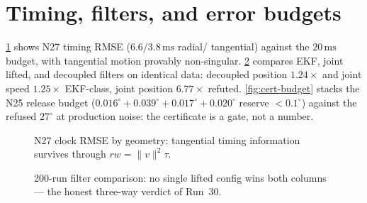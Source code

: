 \documentclass[11pt,oneside]{book}
\begin{document}
\section{Timing, filters, and error budgets}
\label{sec:budgets}

\cref{fig:clock-bars} shows N27 timing RMSE ($6.6/3.8\,\mathrm{ms}$ radial/
tangential) against the $20\,\mathrm{ms}$ budget, with tangential motion
provably non-singular. \cref{fig:gram-bars} compares EKF, joint lifted, and
decoupled filters on identical data: decoupled position $1.24\times$ and
joint speed $1.25\times$ EKF-class, joint position $6.77\times$ refuted.
\cref{fig:cert-budget} stacks the N25 release budget
($0.016^\circ+0.039^\circ+0.017^\circ+0.020^\circ$ reserve $<0.1^\circ$)
against the refused $27^\circ$ at production noise: the certificate is a
gate, not a number.

\begin{figure}[htbp]
\centering
{}
\caption{N27 clock RMSE by geometry: tangential timing information survives
through $rw=\|v\|^2\tau$.}
\label{fig:clock-bars}
\end{figure}

\begin{figure}[htbp]
\centering
{}
\caption{200-run filter comparison: no single lifted config wins both
columns --- the honest three-way verdict of Run~30.}
\label{fig:gram-bars}
\end{figure}
\end{document}

